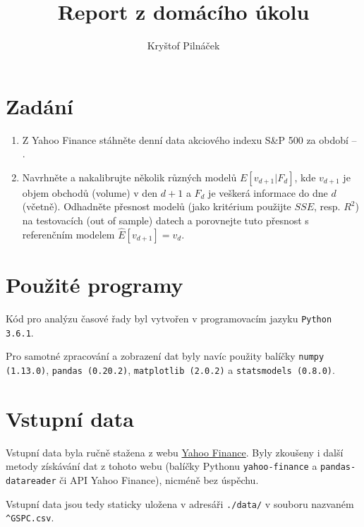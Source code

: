 \documentclass[a4paper,12pt, czech]{article}
\title{Report z domácího úkolu}
\author{Kryštof Pilnáček}
\newcommand{\code}[1]{\texttt{#1}}
\begin{document}
\maketitle

\clearpage

\section{Zadání} \label{sec:zadani}

\begin{enumerate}
	\item Z Yahoo Finance stáhněte denní data akciového indexu S\&P 500 za období  -- . \label{list:zadani_data}
	
	\item  Navrhněte a nakalibrujte několik různých modelů $E\left[v_{d+1}|F_d\right]$, kde $v_{d+1}$ je objem obchodů (volume) v den $d+1$ a $F_d$ je veškerá informace do dne $d$ (včetně). \label{list:zadani_modely}
	Odhadněte přesnost modelů (jako kritérium použijte $SSE$, resp. $R^2$) na testovacích (out of sample) datech a porovnejte tuto přesnost s referenčním modelem $\hat{E}\left[v_{d+1}\right] = v_d$.
	
\end{enumerate}

\section{Použité programy}

Kód pro analýzu časové řady byl vytvořen v programovacím jazyku \code{Python 3.6.1}.

Pro samotné zpracování a zobrazení dat byly navíc použity balíčky \code{numpy (1.13.0)}, \code{pandas (0.20.2)}, \code{matplotlib (2.0.2)} a \code{statsmodels (0.8.0)}.

\section{Vstupní data}

Vstupní data byla ručně stažena z webu \href{https://finance.yahoo.com/quote/\%5EGSPC/history?period1=1262300400\&period2=1497045600\&interval=1d\&filter=history\&frequency=1d}{Yahoo Finance}.
Byly zkoušeny i další metody získávání dat z tohoto webu (balíčky Pythonu \code{yahoo-finance} a \code{pandas-datareader} či API Yahoo Finance), nicméně bez úspěchu.

Vstupní data jsou tedy staticky uložena v adresáři \code{./data/} v souboru nazvaném \code{\^{}GSPC.csv}.
\end{document}
